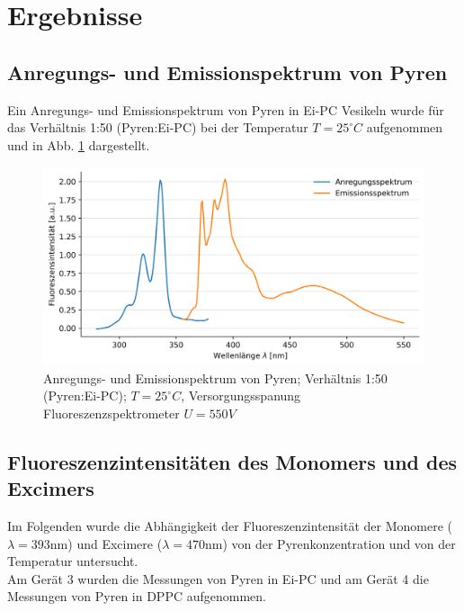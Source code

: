\section{Ergebnisse}
\subsection{Anregungs- und Emissionspektrum von Pyren}
Ein Anregungs- und Emissionspektrum von Pyren in Ei-PC Vesikeln wurde für das Verhältnis 1:50 (Pyren:Ei-PC) bei der Temperatur $T=25^\circ C$ aufgenommen und in Abb. \ref{Em_Ex_Scan} dargestellt.
\begin{figure}[h!]
	\begin{center}
		\begin{minipage}{0,8\textwidth}
			
			\includegraphics[width=\textwidth]{analysis/reports/Em_Ex_Scan_50.png}
			\caption{Anregungs- und Emissionspektrum von Pyren; Verhältnis 1:50 (Pyren:Ei-PC); $T=25^\circ C$, Versorgungsspanung Fluoreszenzspektrometer $U=550V$} 
			\label{Em_Ex_Scan} 
		\end{minipage}
	\end{center}
\end{figure}

\subsection{Fluoreszenzintensitäten des Monomers und des Excimers}
Im Folgenden wurde die Abhängigkeit der Fluoreszenzintensität der Monomere  ($\lambda=393$nm) und Excimere ($\lambda=470$nm) von der Pyrenkonzentration und von der Temperatur untersucht.\\
Am Gerät 3 wurden die Messungen von Pyren in Ei-PC und am Gerät 4 die Messungen von Pyren in DPPC aufgenommen.


